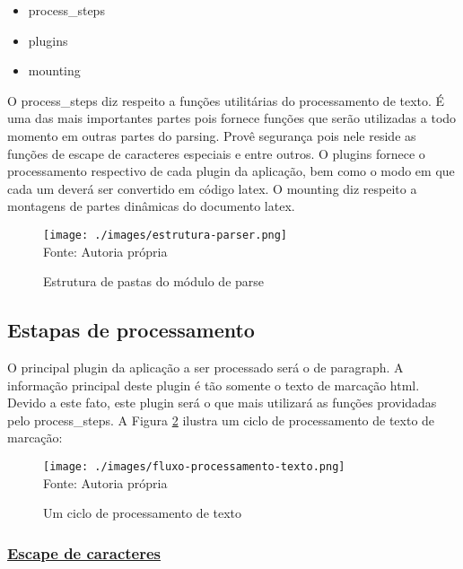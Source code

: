 \begin{itemize}
        
	\item process\_steps
	\item plugins
	\item mounting
    
\end{itemize}

O process\_steps diz respeito a funções utilitárias do processamento de texto.
É uma das mais importantes partes pois fornece funções que serão utilizadas a todo
momento em outras partes do parsing. Provê segurança pois nele reside as funções
de escape de caracteres especiais e entre outros.
O plugins fornece o processamento respectivo de cada plugin da aplicação,
bem como o modo em que cada um deverá ser convertido em código
\acrshort{latex}.
O mounting diz respeito a montagens de partes dinâmicas do documento
\acrshort{latex}.

\begin{figure}[H]
    \centering
    \caption{Estrutura de pastas do módulo de parse}
    \texttt{[image: ./images/estrutura-parser.png]}
    \label{fig:estrutura-parser} \\
    \textnormal{\fontsize{10pt}{12pt}Fonte: Autoria própria}
\end{figure}

\subsection{Estapas de processamento}

O principal plugin da aplicação a ser processado será o de paragraph.
A informação principal deste plugin é tão somente o texto de marcação
\acrshort{html}. Devido a este fato, este plugin
será o que mais utilizará as funções providadas pelo process\_steps.
A
Figura \ref{fig:fluxo-processamento-texto}
ilustra um ciclo de processamento de texto de marcação:

\begin{figure}[H]
    \centering
    \caption{Um ciclo de processamento de texto}
    \texttt{[image: ./images/fluxo-processamento-texto.png]}
    \label{fig:fluxo-processamento-texto} \\
    \textnormal{\fontsize{10pt}{12pt}Fonte: Autoria própria}
\end{figure}



\subsubsection{\underline{Escape de caracteres}}

